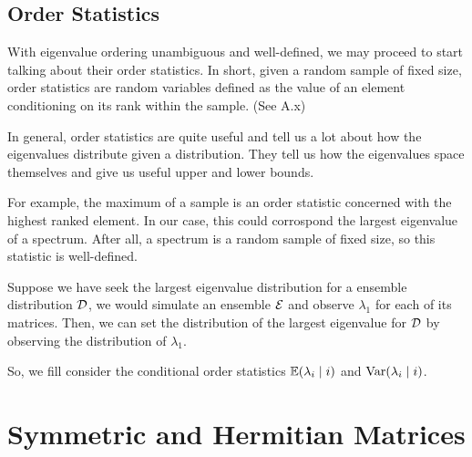 \spectrumschemetable


\subsection{Order Statistics}

With eigenvalue ordering unambiguous and well-defined, we may proceed to start talking about their order statistics. In short, given a random sample of fixed size, order statistics are random variables defined as the value of an element conditioning on its rank within the sample. (See A.x)

In general, order statistics are quite useful and tell us a lot about how the eigenvalues distribute given a distribution. They tell us how the eigenvalues space themselves and give us useful upper and lower bounds.

For example, the maximum of a sample is an order statistic concerned with the highest ranked element. In our case, this could corrospond the largest eigenvalue of a spectrum. After all, a spectrum is a random sample of fixed size, so this statistic is well-defined.

\begin{example}
Suppose we have seek the largest eigenvalue distribution for a ensemble distribution $\mathcal{D}$, we would simulate an ensemble $\mathcal{E}$ and observe $\lambda_1$ for each of its matrices. Then, we can set the distribution of the largest eigenvalue for $\mathcal{D}$ by observing the distribution of $\lambda_1$.
\end{example}

So, we fill consider the conditional order statistics $\mathbb{E}(\lambda_{i} \mid i)$ and $\text{Var}(\lambda_{i} \mid i)$.

\newpage
\section{Symmetric and Hermitian Matrices}

